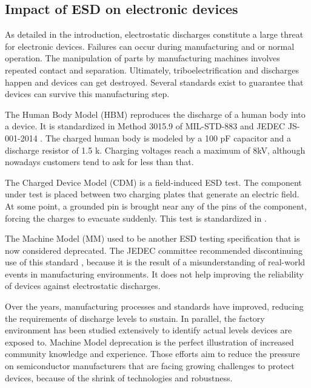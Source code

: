 \subsection{Impact of ESD on electronic devices}

As detailed in the introduction, electrostatic discharges constitute a large threat for electronic devices.
Failures can occur during manufacturing and or normal operation.
The manipulation of parts by manufacturing machines involves repeated contact and separation.
Ultimately, triboelectrification and discharges happen and devices can get destroyed.
Several standards exist to guarantee that devices can survive this manufacturing step.

The Human Body Model (HBM) reproduces the discharge of a human body into a device.
It is standardized in Method 3015.9 of MIL-STD-883 \cite{MIL-STD-883} and JEDEC JS-001-2014 \cite{jedec-001}.
The charged human body is modeled by a 100 pF capacitor and a discharge resistor of 1.5 k\textOmega{}.
Charging voltages reach a maximum of 8kV, although nowadays customers tend to ask for less than that.

The Charged Device Model (CDM) is a field-induced ESD test.
The component under test is placed between two charging plates that generate an electric field.
At some point, a grounded pin is brought near any of the pins of the component, forcing the charges to evacuate suddenly.
This test is standardized in \cite{jedec-002}.

The Machine Model (MM) used to be another ESD testing specification that is now considered deprecated.
The JEDEC committee recommended discontinuing use of this standard \cite{discontinued-mm}, because it is the result of a misunderstanding of real-world events in manufacturing environments.
It does not help improving the reliability of devices against electrostatic discharges.


%
Over the years, manufacturing processes and standards have improved, reducing the requirements of discharge levels to sustain.
In parallel, the factory environment has been studied extensively to identify actual levels devices are exposed to.
Machine Model deprecation is the perfect illustration of increased community knowledge and experience.
Those efforts aim to reduce the pressure on semiconductor manufacturers that are facing growing challenges to protect devices, because of the shrink of technologies and robustness.

